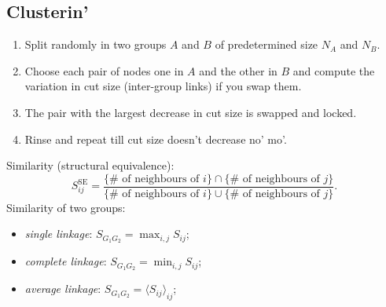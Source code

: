 \documentclass[a4paper,9pt]{extarticle}
\begin{document}
\begin{multicols*}{2}
		\subsection{Clusterin'}
		\begin{riquadro}
			\begin{enumerate}
				\item Split randomly in two groups $A$ and $B$ of predetermined size $N_{A}$ and $N_{B}$.\\
				\item Choose each pair of nodes one in $A$ and the other in $B$ and compute the variation in cut size (inter-group links) if you swap them.
				\item The pair with the largest decrease in cut size is swapped and locked.
				\item Rinse and repeat till cut size doesn't decrease no' mo'.
			\end{enumerate}
		\end{riquadro}
		Similarity (structural equivalence):
		\begin{equation*}
			S^{\text{SE}}_{ij}=\frac{\{\text{$\#$ of neighbours of $i$}\}\cap\{\text{$\#$ of neighbours of $j$}\}}{\{\text{$\#$ of neighbours of $i$}\}\cup\{\text{$\#$ of neighbours of $j$}\}}.
		\end{equation*}
		Similarity of two groups:
		\begin{itemize}
			\item \textit{single linkage}: $S_{G_{1}G_{2}}=\max_{i,j}S_{ij}$;
			\item \textit{complete linkage}: $S_{G_{1}G_{2}}=\min_{i,j}S_{ij}$;
			\item \textit{average linkage}: $S_{G_{1}G_{2}}={\langle S_{ij}\rangle}_{ij}$;
		\end{itemize}

\end{multicols*}
\end{document}
